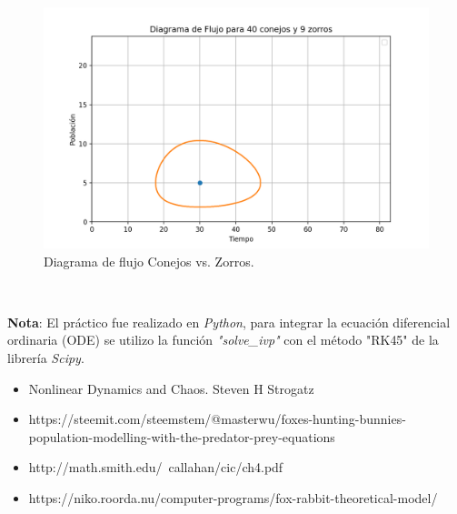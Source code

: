 \documentclass{article}
\begin{document}
\begin{figure}[H]
\centering
\includegraphics[width=\textwidth]{Figure_3.png}
\caption{Diagrama de flujo Conejos vs. Zorros.}
\label{fig:Figure_3.png}
\end{figure}

\


\textbf{Nota}: El práctico fue realizado en \textit{Python}, para integrar la ecuación diferencial ordinaria (ODE) se utilizo la función \textit{"solve\_ivp"} con el método "RK45" de la librería \textit{Scipy}.

    



\begin{itemize}
\item Nonlinear Dynamics and Chaos. Steven H Strogatz

\item https://steemit.com/steemstem/@masterwu/foxes-hunting-bunnies-population-modelling-with-the-predator-prey-equations

\item http://math.smith.edu/~callahan/cic/ch4.pdf

\item https://niko.roorda.nu/computer-programs/fox-rabbit-theoretical-model/
\end{itemize}
\end{document}
